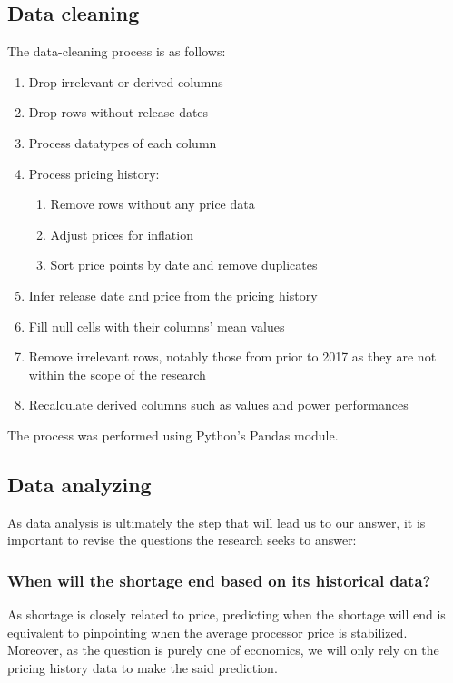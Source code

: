 \documentclass[conference]{IEEEtran}
\begin{document}
\subsection{Data cleaning}
The data-cleaning process is as follows:
\begin{enumerate}
	\item Drop irrelevant or derived columns
	\item Drop rows without release dates
	\item Process datatypes of each column
	\item Process pricing history:
	      \begin{enumerate}
		      \item Remove rows without any price data
		      \item Adjust prices for inflation
		      \item Sort price points by date and remove duplicates
	      \end{enumerate}
	\item Infer release date and price from the pricing history
	\item Fill null cells with their columns' mean values
	\item Remove irrelevant rows, notably those from prior to 2017 as they are
	      not within the scope of the research
	\item Recalculate derived columns such as values and power performances
\end{enumerate}

The process was performed using Python's Pandas module.

\subsection{Data analyzing}
As data analysis is ultimately the step that will lead us to our answer, it is
important to revise the questions the research seeks to answer:

\subsubsection{When will the shortage end based on its historical data?}

As shortage is closely related to price, predicting when the shortage will end
is equivalent to pinpointing when the average processor price is stabilized.
Moreover, as the question is purely one of economics, we will only rely on the
pricing history data to make the said prediction.
\end{document}
